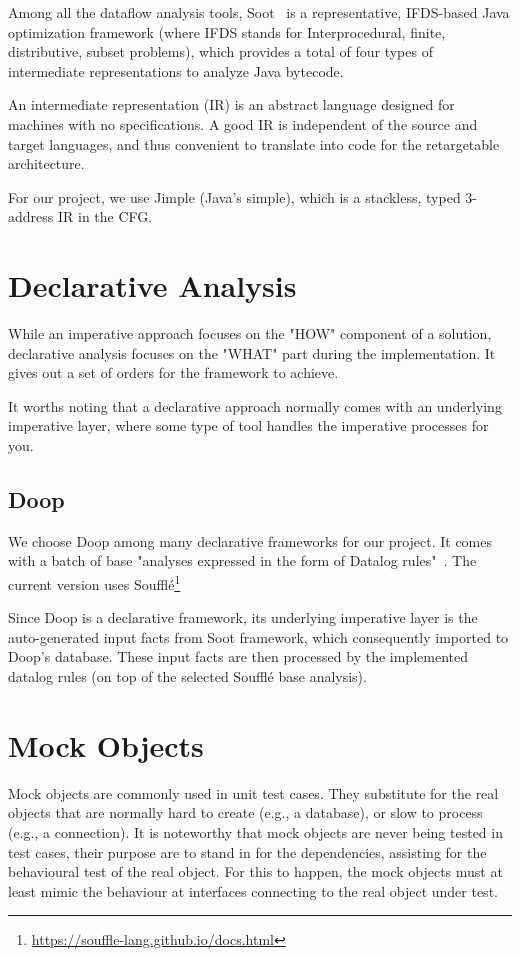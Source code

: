 Among all the dataflow analysis tools, Soot~\cite{Vallee-Rai:1999:SJB:781995.782008} is a representative, IFDS-based Java optimization framework (where IFDS stands for Interprocedural, finite, distributive, subset problems), which provides a total of four types of intermediate representations to analyze Java bytecode. 

An intermediate representation (IR) is an abstract language designed for machines with no specifications. A good IR is independent of the source and target languages, and thus convenient to translate into code for the retargetable architecture.

For our project, we use Jimple (Java's simple), which is a stackless, typed 3-address IR in the CFG.

\section{Declarative Analysis}

While an imperative approach focuses on the "HOW" component of a solution, declarative analysis focuses on the "WHAT" part during the implementation. It gives out a set of orders for the framework to achieve.

It worths noting that a declarative approach normally comes with an underlying imperative layer, where some type of tool handles the imperative processes for you.

\subsection{Doop}

We choose Doop among many declarative frameworks for our project. It comes with a batch of base "analyses expressed in the form of Datalog rules"~\cite{doop-repo}. The current version uses Soufflé\footnote{\url{https://souffle-lang.github.io/docs.html}}

Since Doop is a declarative framework, its underlying imperative layer is the auto-generated input facts from Soot framework, which consequently imported to Doop's database. These input facts are then processed by the implemented datalog rules (on top of the selected Soufflé base analysis).


\section{Mock Objects} 

Mock objects are commonly used in unit test cases. They substitute for the real objects that are normally hard to create (e.g., a database), or slow to process (e.g., a connection). It is noteworthy that mock objects are never being tested in test cases, their purpose are to stand in for the dependencies, assisting for the behavioural test of the real object. For this to happen, the mock objects must at least mimic the behaviour at interfaces connecting to the real object under test.

